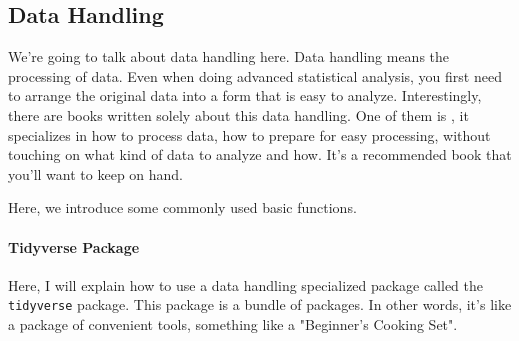 \documentclass{ltjsbook}
\begin{document}
\subsection{Data Handling}
\label{dataHandling}
We're going to talk about data handling here. Data handling means the processing of data. Even when doing advanced statistical analysis, you first need to arrange the original data into a form that is easy to analyze.
Interestingly, there are books written solely about this data handling. One of them is \textcite{Kinosady2021}, it specializes in how to process data, how to prepare for easy processing, without touching on what kind of data to analyze and how. It's a recommended book that you'll want to keep on hand.

Here, we introduce some commonly used basic functions.

\paragraph{Tidyverse Package}
Here, I will explain how to use a data handling specialized package called the \verb|tidyverse| package. This package is a bundle of packages. In other words, it's like a package of convenient tools, something like a "Beginner's Cooking Set".
\end{document}
